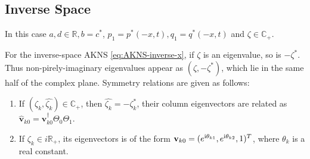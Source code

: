 \subsection{Inverse Space}
In this case $ a, d \in \mathbb{R}, b = c^{*} $, $ p_{1} = p^{*}(-x,t), q_{1} = q^{*}(-x,t) $ and $ \zeta \in \mathbb{C}_{+} $.
\begin{theorem}
    For the inverse-space AKNS \eqref{eq:AKNS-inverse-x}, if $ \zeta $ is an eigenvalue, so is $ -\zeta^{*} $. Thus non-pirely-imaginary eigenvalues appear as $(\zeta, -\zeta^{*})$, which lie in the same half of the complex plane. Symmetry relations are given as follows:
    \begin{enumerate}
        \item If $ (\zeta_{k}, \hat{\zeta_{k}}) \in \mathbb{C_{+}}$, then $\hat{\zeta_{k}} = - \zeta^{*}_{k} $, their column eigenvectors are related as $\hat{\mathbf{v}}_{k0} = \mathbf{v}_{k0}^{\dagger}\Theta_{0}\Theta_{1}$.
        \item If $ \zeta_{k} \in i\mathbb{R}_{+} $, its eigenvectors is of the form $\mathbf{v}_{k0} = (e^{\mathrm{i}\theta_{k1}}, e^{\mathrm{i}\theta_{k2}}, 1 )^{T} $, where $ \theta_{k} $ is a real constant.
    \end{enumerate}
\end{theorem}
